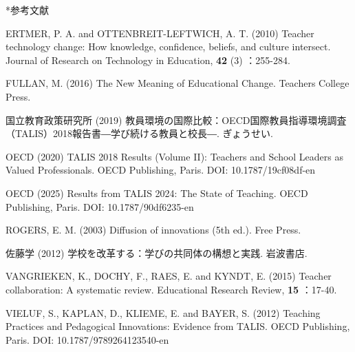 \documentclass[a4paper,10pt,twocolumn]{ltjsarticle}
\makeatletter
\renewcommand{\section}{\@startsection{section}{1}{\z@}{1.1\Cvs \@plus.4\Cdp \@minus.2\Cdp}{.5\Cvs \@plus.2\Cdp}{\normalfont\gtfamily\bfseries\large}}
\makeatother
\begin{document}
\section*{参考文献}
\begingroup\scriptsize\raggedright{} 
\begin{list}{}{\setlength{\leftmargin}{1.5\zw}\setlength{\itemindent}{-1.5\zw}\setlength{\labelwidth}{0pt}\setlength{\labelsep}{0pt}\setlength{\itemsep}{1pt}\setlength{\parsep}{0pt}\setlength{\topsep}{0pt}\setlength{\listparindent}{0pt}}
\item ERTMER, P. A. and OTTENBREIT-LEFTWICH, A. T. (2010) Teacher technology change: How knowledge, confidence, beliefs, and culture intersect. Journal of Research on Technology in Education, \textbf{42} (3) ：255-284.
\item FULLAN, M. (2016) The New Meaning of Educational Change. Teachers College Press.
\item 国立教育政策研究所 (2019) 教員環境の国際比較：OECD国際教員指導環境調査（TALIS）2018報告書―学び続ける教員と校長―. ぎょうせい.
\item OECD (2020) TALIS 2018 Results (Volume II): Teachers and School Leaders as Valued Professionals. OECD Publishing, Paris. DOI: 10.1787/19cf08df-en
\item OECD (2025) Results from TALIS 2024: The State of Teaching. OECD Publishing, Paris. DOI: 10.1787/90df6235-en
\item ROGERS, E. M. (2003) Diffusion of innovations (5th ed.). Free Press.
\item 佐藤学 (2012) 学校を改革する：学びの共同体の構想と実践. 岩波書店.
\item VANGRIEKEN, K., DOCHY, F., RAES, E. and KYNDT, E. (2015) Teacher collaboration: A systematic review. Educational Research Review, \textbf{15} ：17-40.
\item VIELUF, S., KAPLAN, D., KLIEME, E. and BAYER, S. (2012) Teaching Practices and Pedagogical Innovations: Evidence from TALIS. OECD Publishing, Paris. DOI: 10.1787/9789264123540-en
\end{list}\endgroup
\end{document}
